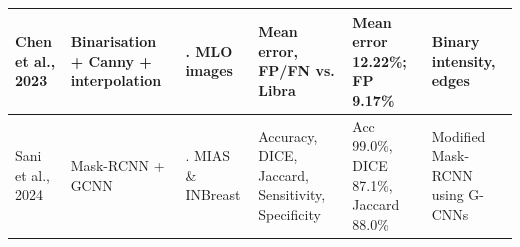 \documentclass[runningheads]{llncs}
\begin{document}
\begin{table}[htbp]
\begin{tabularx}{\textwidth}{|>{\hsize=0.6\hsize}X|>{\hsize=1.2\hsize}X|>{\hsize=1.\hsize}X|>{\hsize=1.0\hsize}X|>{\hsize=1.1\hsize}X|>{\hsize=1.1\hsize}X|}
Chen et al., 2023 \cite{Chen2024} & Binarisation + Canny + interpolation & 1902 MLO images & Mean error, FP/FN vs. Libra & Mean error 12.22\%; FP 9.17\% & Binary intensity, edges \\ \hline


Sani et al., 2024 \cite{Sani2023} & Mask-RCNN + GCNN & MIAS \&
                                                       INBreast &
                                                                  Accuracy,
                                                                  DICE,
Jaccard, Sensitivity, Specificity& Acc 99.0\%, DICE 87.1\%,  Jaccard
                                   88.0\% & Modified Mask-RCNN using G-CNNs \\ \hline
\end{tabularx}
\end{table}
\end{document}
